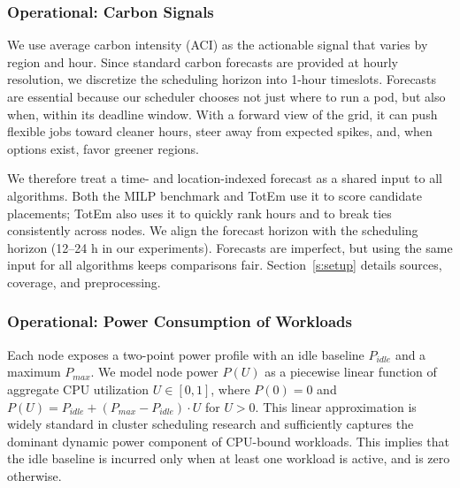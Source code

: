 \documentclass[10pt,journal,compsoc]{IEEEtran}
\begin{document}
\subsubsection{Operational: Carbon Signals}\label{s:sig}

We use average carbon intensity (ACI) as the actionable signal that varies by region and hour. Since standard carbon forecasts are provided at hourly resolution, we discretize the scheduling horizon into 1-hour timeslots. Forecasts are essential because our scheduler chooses not just where to run a pod, but also when, within its deadline window. With a forward view of the grid, it can push flexible jobs toward cleaner hours, steer away from expected spikes, and, when options exist, favor greener regions.

We therefore treat a time- and location-indexed forecast as a shared input to all algorithms. Both the MILP benchmark and TotEm use it to score candidate placements; TotEm also uses it to quickly rank hours and to break ties consistently across nodes. We align the forecast horizon with the scheduling horizon (12–24 h in our experiments). Forecasts are imperfect, but using the same input for all algorithms keeps comparisons fair. Section~\ref{s:setup} details sources, coverage, and preprocessing.

\subsubsection{Operational: Power Consumption of Workloads}\label{s:pwr}

Each node exposes a two-point power profile with an idle baseline \(P_{idle}\) and a maximum \(P_{max}\). We model node power \(P(U)\) as a piecewise linear function of aggregate CPU utilization \(U \in [0,1]\), where \(P(0)=0\) and \(P(U) = P_{idle} + (P_{max} - P_{idle}) \cdot U\) for \(U>0\). This linear approximation is widely standard in cluster scheduling research \cite{fan2007power} and sufficiently captures the dominant dynamic power component of CPU-bound workloads. This implies that the idle baseline is incurred only when at least one workload is active, and is zero otherwise.
\end{document}
